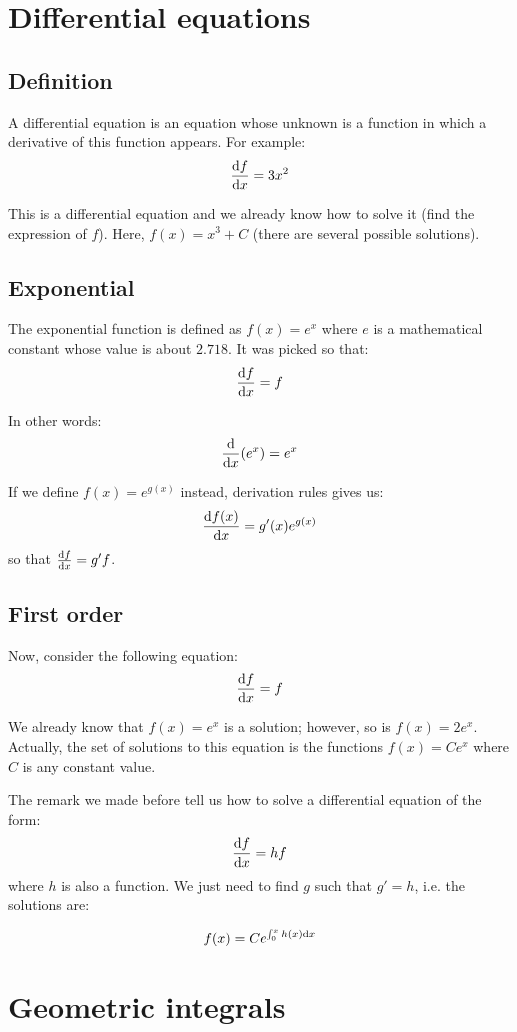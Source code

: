 \section{Differential equations}

\subsection{Definition}

A differential equation is an equation whose unknown is a function in
which a derivative of this function appears. For example:
\[
\frac {\mathrm{d} f} {\mathrm{d} x} = 3x^2
\]

This is a differential equation and we already know how to solve it
(find the expression of $f$). Here, $f(x) = x^3 + C$ (there are several
possible solutions).

\subsection{Exponential}

The exponential function is defined as $f(x) = e^x$ where $e$ is a
mathematical constant whose value is about $2.718$. It was picked so that:
\[
\frac {\mathrm{d} f} {\mathrm{d} x} = f
\]

In other words:
\[
\frac {\mathrm{d}} {\mathrm{d} x} (e^x) = e^x
\]

\begin{remark}
If we define $f(x) = e^{g(x)}$ instead, derivation rules
gives us:
\[
\frac {\mathrm{d} f(x)} {\mathrm{d} x}
= g'(x) e^{g(x)}
\]
so that $\frac {\mathrm{d} f} {\mathrm{d} x} = g' f$.
\end{remark}

\subsection{First order}

Now, consider the following equation:
\[
\frac {\mathrm{d} f} {\mathrm{d} x} = f
\]

We already know that $f(x) = e^x$ is a solution; however, so is $f(x) =
2 e^x$. Actually, the set of solutions to this equation is the functions
$f(x) = C e^x$ where $C$ is any constant value.

The remark we made before tell us how to solve a differential equation
of the form:
\[
\frac {\mathrm{d} f} {\mathrm{d} x} = h f
\]
where $h$ is also a function. We just need to find $g$ such that $g' =
h$, i.e. the solutions are:

\[
f(x) = C e^{\int_0^x h(x) \mathrm{d} x}
\]

\section{Geometric integrals}

